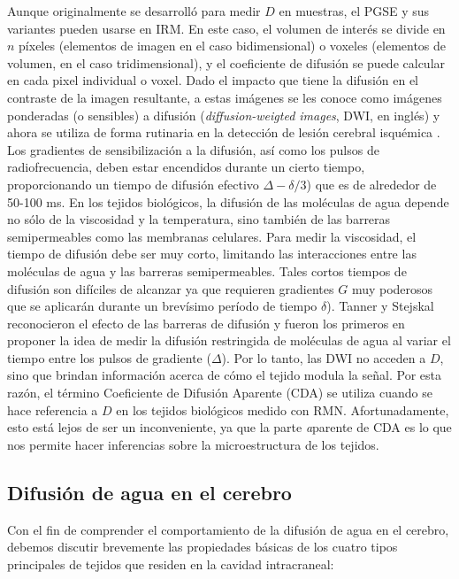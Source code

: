 Aunque originalmente se desarrolló para medir $D$ en muestras, el PGSE y sus variantes pueden usarse en IRM. En este caso, el volumen de interés se divide en $n$ píxeles (elementos de imagen en el caso bidimensional) o voxeles (elementos de volumen, en el caso tridimensional), y el coeficiente de difusión se puede calcular en cada pixel individual o voxel. Dado el impacto que tiene la difusión en el contraste de la imagen resultante, a estas imágenes se les conoce como imágenes ponderadas (o sensibles) a difusión (\textit{diffusion-weigted images}, DWI, en inglés) \cite{Wesbey_1984} y ahora se utiliza de forma rutinaria en la detección de lesión cerebral isquémica \cite{Sotak_2002}. Los gradientes de sensibilización a la difusión, así como los pulsos de radiofrecuencia, deben estar encendidos durante un cierto tiempo, proporcionando un tiempo de difusión efectivo $\Delta - \delta/3$) que es de alrededor de 50-100 ms. En los tejidos biológicos, la difusión de las moléculas de agua depende no sólo de la viscosidad y la temperatura, sino también de las barreras semipermeables como las membranas celulares. Para medir la viscosidad, el tiempo de difusión debe ser muy corto, limitando las interacciones entre las moléculas de agua y las barreras semipermeables. Tales cortos tiempos de difusión son difíciles de alcanzar ya que requieren gradientes $G$ muy poderosos que se aplicarán durante un brevísimo período de tiempo $\delta$). Tanner y Stejskal \cite{Tanner_1968} reconocieron el efecto de las barreras de difusión y fueron los primeros en proponer la idea de medir la difusión restringida de moléculas de agua al variar el tiempo entre los pulsos de gradiente ($\Delta$). Por lo tanto, las DWI no acceden a $D$, sino que brindan información acerca de cómo el tejido modula la señal. Por esta razón, el término Coeficiente de Difusión Aparente (CDA) se utiliza cuando se hace referencia a $D$ en los tejidos biológicos medido con RMN. Afortunadamente, esto está lejos de ser un inconveniente, ya que la parte {\emph aparente} de CDA es lo que nos permite hacer inferencias sobre la microestructura de los tejidos.

\subsection{Difusión de agua en el cerebro}

Con el fin de comprender el comportamiento de la difusión de agua en el cerebro, debemos discutir brevemente las propiedades básicas de los cuatro tipos principales de tejidos que residen en la cavidad intracraneal:

